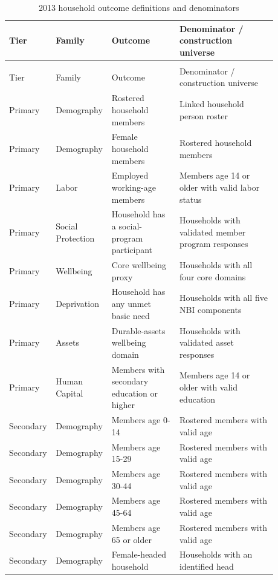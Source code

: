 \begingroup\fontsize{9.25}{11.4}\selectfont
\setlength{\tabcolsep}{3pt}\renewcommand{\arraystretch}{1.18}
\begin{longtable}{@{}>{\raggedright\arraybackslash}p{0.10\linewidth}p{0.17\linewidth}p{0.25\linewidth}p{0.36\linewidth}@{}}
\caption{2013 household outcome definitions and denominators}\label{tab:pub_A12} \\
\toprule Tier & Family & Outcome & Denominator / construction universe \\ \midrule\endfirsthead
\multicolumn{4}{c}{\tablename\ \thetable{} -- continued} \\
\toprule Tier & Family & Outcome & Denominator / construction universe \\ \midrule\endhead
Primary & Demography & Rostered household members & Linked household person roster \\
Primary & Demography & Female household members & Rostered household members \\
Primary & Labor & Employed working-age members & Members age 14 or older with valid labor status \\
Primary & Social Protection & Household has a social-program participant & Households with validated member program responses \\
Primary & Wellbeing & Core wellbeing proxy & Households with all four core domains \\
Primary & Deprivation & Household has any unmet basic need & Households with all five NBI components \\
Primary & Assets & Durable-assets wellbeing domain & Households with validated asset responses \\
Primary & Human Capital & Members with secondary education or higher & Members age 14 or older with valid education \\
Secondary & Demography & Members age 0-14 & Rostered members with valid age \\
Secondary & Demography & Members age 15-29 & Rostered members with valid age \\
Secondary & Demography & Members age 30-44 & Rostered members with valid age \\
Secondary & Demography & Members age 45-64 & Rostered members with valid age \\
Secondary & Demography & Members age 65 or older & Rostered members with valid age \\
Secondary & Demography & Female-headed household & Households with an identified head \\

\end{longtable}
